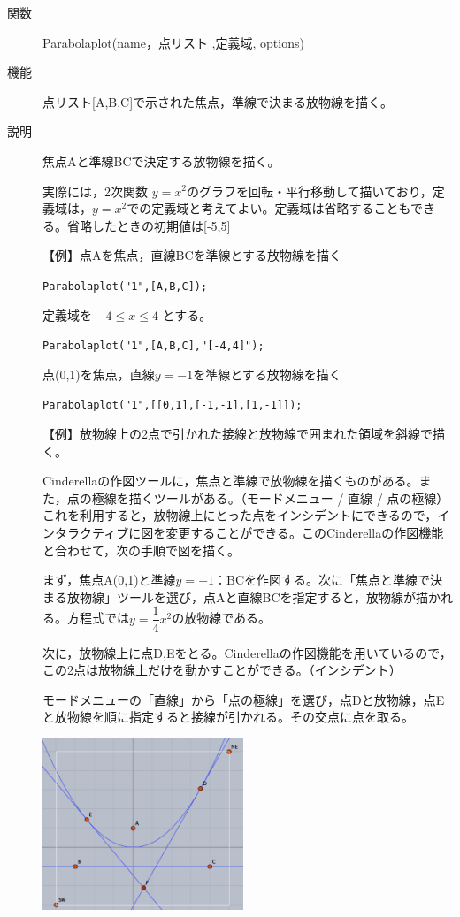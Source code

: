 \documentclass[papersize,a4paper,10pt,uplatex]{jsarticle}
\begin{document}
\begin{description}
\vspace{\baselineskip}
\hypertarget{parabolaplot}{}
\item[関数]Parabolaplot(name，点リスト ,定義域, options)
\item[機能]点リスト[A,B,C]で示された焦点，準線で決まる放物線を描く。
\item[説明]焦点Aと準線BCで決定する放物線を描く。

実際には，2次関数 $y=x^2$のグラフを回転・平行移動して描いており，定義域は，$y=x^2$での定義域と考えてよい。定義域は省略することもできる。省略したときの初期値は[-5,5]

\vspace{\baselineskip}
【例】点Aを焦点，直線BCを準線とする放物線を描く

\hspace{10mm}\verb|Parabolaplot("1",[A,B,C]); |

定義域を $-4 \leq x \leq 4$ とする。

\hspace{10mm} \verb|Parabolaplot("1",[A,B,C],"[-4,4]");|

点(0,1)を焦点，直線$y=-1$を準線とする放物線を描く

\hspace{10mm} \verb|Parabolaplot("1",[[0,1],[-1,-1],[1,-1]]);|

\vspace{\baselineskip}
【例】放物線上の2点で引かれた接線と放物線で囲まれた領域を斜線で描く。

Cinderellaの作図ツールに，焦点と準線で放物線を描くものがある。また，点の極線を描くツールがある。（モードメニュー / 直線 / 点の極線）これを利用すると，放物線上にとった点をインシデントにできるので，インタラクティブに図を変更することができる。このCinderellaの作図機能と合わせて，次の手順で図を描く。

まず，焦点A(0,1)と準線$y=-1$：BCを作図する。次に「焦点と準線で決まる放物線」ツールを選び，点Aと直線BCを指定すると，放物線が描かれる。方程式では$y=\dfrac{1}{4}x^2$の放物線である。

次に，放物線上に点D,Eをとる。Cinderellaの作図機能を用いているので，この2点は放物線上だけを動かすことができる。（インシデント）

モードメニューの「直線」から「点の極線」を選び，点Dと放物線，点Eと放物線を順に指定すると接線が引かれる。その交点に点を取る。

\vspace{\baselineskip}
\begin{center} \includegraphics[bb=0 0 482.02 413.02 , width=6cm]{Fig/parabolaplot.pdf} \end{center}


\end{description}
\end{document}
